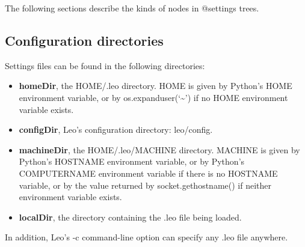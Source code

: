 \documentclass[a4paper,10pt,english]{sphinxmanual}
\begin{document}
The following sections describe the kinds of nodes in @settings trees.


\subsection{Configuration directories}
\label{customizing:configuration-directories}
Settings files can be found in the following directories:
\begin{itemize}
\item {} 
\textbf{homeDir}, the HOME/.leo directory. HOME is given by Python's HOME
environment variable, or by os.expanduser(`\textasciitilde{}') if no HOME environment variable
exists.

\item {} 
\textbf{configDir}, Leo's configuration directory: leo/config.

\item {} 
\textbf{machineDir}, the HOME/.leo/MACHINE directory. MACHINE is given by Python's
HOSTNAME environment variable, or by Python's COMPUTERNAME environment
variable if there is no HOSTNAME variable, or by the value returned by
socket.gethostname() if neither environment variable exists.

\item {} 
\textbf{localDir}, the directory containing the .leo file being loaded.

\end{itemize}

In addition, Leo's -c command-line option can specify any .leo file anywhere.
\end{document}
